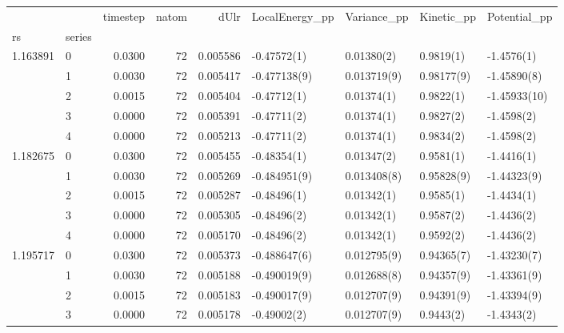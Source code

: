 \begin{tabular}{llrrrllll}
\toprule
         &   &  timestep &  natom &      dUlr & LocalEnergy\_pp &    Variance\_pp &     Kinetic\_pp &    Potential\_pp \\
rs & series &           &        &           &                &                &                &                 \\
\midrule
1.163891 & 0 &    0.0300 &     72 &  0.005586 &    -0.47572(1) &     0.01380(2) &      0.9819(1) &      -1.4576(1) \\
         & 1 &    0.0030 &     72 &  0.005417 &   -0.477138(9) &    0.013719(9) &     0.98177(9) &     -1.45890(8) \\
         & 2 &    0.0015 &     72 &  0.005404 &    -0.47712(1) &     0.01374(1) &      0.9822(1) &    -1.45933(10) \\
         & 3 &    0.0000 &     72 &  0.005391 &    -0.47711(2) &     0.01374(1) &      0.9827(2) &      -1.4598(2) \\
         & 4 &    0.0000 &     72 &  0.005213 &    -0.47711(2) &     0.01374(1) &      0.9834(2) &      -1.4598(2) \\
1.182675 & 0 &    0.0300 &     72 &  0.005455 &    -0.48354(1) &     0.01347(2) &      0.9581(1) &      -1.4416(1) \\
         & 1 &    0.0030 &     72 &  0.005269 &   -0.484951(9) &    0.013408(8) &     0.95828(9) &     -1.44323(9) \\
         & 2 &    0.0015 &     72 &  0.005287 &    -0.48496(1) &     0.01342(1) &      0.9585(1) &      -1.4434(1) \\
         & 3 &    0.0000 &     72 &  0.005305 &    -0.48496(2) &     0.01342(1) &      0.9587(2) &      -1.4436(2) \\
         & 4 &    0.0000 &     72 &  0.005170 &    -0.48496(2) &     0.01342(1) &      0.9592(2) &      -1.4436(2) \\
1.195717 & 0 &    0.0300 &     72 &  0.005373 &   -0.488647(6) &    0.012795(9) &     0.94365(7) &     -1.43230(7) \\
         & 1 &    0.0030 &     72 &  0.005188 &   -0.490019(9) &    0.012688(8) &     0.94357(9) &     -1.43361(9) \\
         & 2 &    0.0015 &     72 &  0.005183 &   -0.490017(9) &    0.012707(9) &     0.94391(9) &     -1.43394(9) \\
         & 3 &    0.0000 &     72 &  0.005178 &    -0.49002(2) &    0.012707(9) &      0.9443(2) &      -1.4343(2) \\

\end{tabular}

